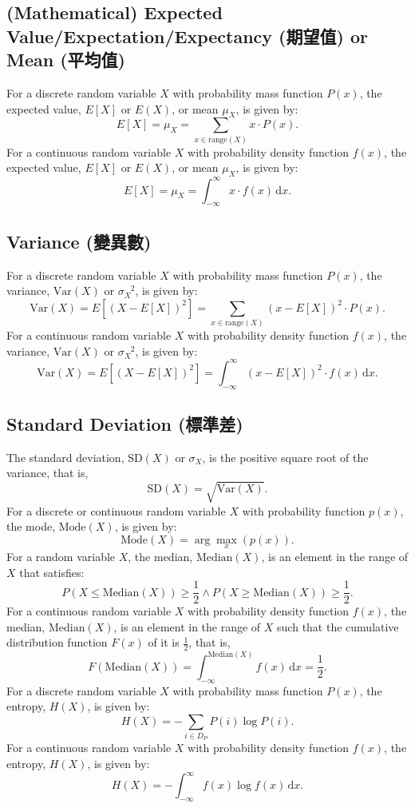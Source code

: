 \documentclass[a4paper,12pt]{report}
\begin{document}
\subsection{(Mathematical) Expected Value/Expectation/Expectancy (期望值) or Mean (平均值)}
For a discrete random variable \( X \) with probability mass function \( P(x) \), the expected value, $E[X]$ or $E(X)$, or mean $\mu_X$, is given by:
\[ E[X] = \mu_X = \sum_{x\in\text{range}(X)}x\cdot P(x).\]
For a continuous random variable \( X \) with probability density function \( f(x) \), the expected value, $E[X]$ or $E(X)$, or mean $\mu_X$, is given by:
\[ E[X] = \mu_X = \int_{-\infty}^{\infty}x\cdot f(x)\,\mathrm{d}x.\]
\subsection{Variance (變異數)}
For a discrete random variable \( X \) with probability mass function \( P(x) \), the variance, $\text{Var}(X)$ or $\sigma_X^{\phantom{X}2}$, is given by:
\[\text{Var}(X) = E[(X - E[X])^2] = \sum_{x \in \text{range}(X)} (x - E[X])^2 \cdot P(x).\]
For a continuous random variable \( X \) with probability density function \( f(x) \), the variance, $\text{Var}(X)$ or $\sigma_X^{\phantom{X}2}$, is given by:
\[\text{Var}(X) = E[(X - E[X])^2] = \int_{-\infty}^{\infty} (x - E[X])^2 \cdot f(x) \, \mathrm{d}x.\]
\subsection{Standard Deviation (標準差)}
The standard deviation, $\text{SD}(X)$ or $\sigma_X$, is the positive square root of the variance, that is,
\[\text{SD}(X) = \sqrt{\text{Var}(X)}.\]
For a discrete or continuous random variable $X$ with probability function $p(x)$, the mode, $\text{Mode}(X)$, is given by:
\[\text{Mode}(X)=\arg\max_x(p(x)).\]
For a random variable \( X \), the median, $\text{Median}(X)$, is an element in the range of $X$ that satisfies:
\[P(X\leq \text{Median}(X))\geq\frac{1}{2}\land P(X\geq \text{Median}(X))\geq\frac{1}{2}.\]
For a continuous random variable $X$ with probability density function $f(x)$, the median, $\text{Median}(X)$, is an element in the range of $X$ such that the cumulative distribution function $F(x)$ of it is $\frac{1}{2}$, that is,
\[F(\text{Median}(X))=\int_{-\infty}^{\text{Median}(X)}f(x)\,\mathrm{d}x=\frac{1}{2}.\]
For a discrete random variable \( X \) with probability mass function \( P(x) \), the entropy, $H(X)$, is given by:
\[H(X)=-\sum_{i\in D_P}P(i)\log P(i).\]
For a continuous random variable \( X \) with probability density function \( f(x) \), the entropy, $H(X)$, is given by:
\[H(X)=-\int_{-\infty}^{\infty}f(x)\log f(x)\,\mathrm{d}x.\]
\end{document}
